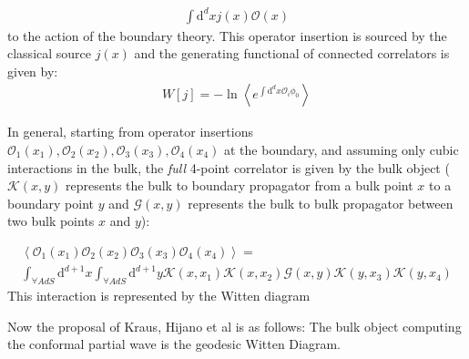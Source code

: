   
  \begin{align*}
   \int \mathrm{d}^dx j(x) \mathcal{O}(x)
  \end{align*}
  to the action of the boundary theory. This operator insertion is sourced by the classical source $j(x)$ and the generating functional of connected correlators is given by:
  \begin{align*}
   W[j] = -\ln \left\langle e^{\int \mathrm{d}^d x \mathcal{O}_i \phi_0 }\right\rangle
  \end{align*}
  
  In general, starting from operator insertions $\mathcal{O}_1(x_1), \mathcal{O}_2(x_2), \mathcal{O}_3(x_3), \mathcal{O}_4(x_4)$ at the boundary, and assuming only cubic interactions in the bulk, the \emph{full} 4-point correlator is given by the bulk object ($\mathcal{K}(x,y)$ represents the bulk to boundary propagator from a bulk point $x$ to a boundary point $y$ and $\mathcal{G}(x,y)$ represents the bulk to bulk propagator between two bulk points $x$ and $y$):
  
  \begin{align*}
   \left\langle \mathcal{O}_1(x_1) \mathcal{O}_2(x_2) \mathcal{O}_3(x_3) \mathcal{O}_4(x_4)\right\rangle = \\   
   \int_{\forall AdS} \mathrm{d}^{d+1}x \int_{\forall AdS} \mathrm{d}^{d+1}y \mathcal{K}(x,x_1)\mathcal{K}(x,x_2) \mathcal{G}(x,y) \mathcal{K}(y,x_3) \mathcal{K}(y,x_4)
  \end{align*}
  This interaction is represented by the Witten diagram

   Now the proposal of Kraus, Hijano et al is as follows: The bulk object computing the conformal partial wave is the geodesic Witten Diagram. 

